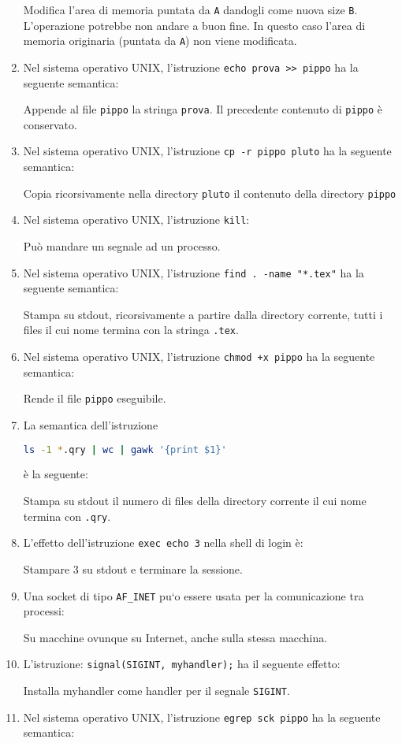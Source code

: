 \documentclass[a4paper,twoside]{article}
\newcommand{\code}[1]{\texttt{#1}}
\begin{document}
\begin{enumerate}
    Modifica l'area di memoria puntata da \code{A} dandogli come nuova size \code{B}. L'operazione potrebbe non andare a buon fine. In questo caso l'area di memoria originaria (puntata da \code{A}) non viene modificata.
    \item Nel sistema operativo UNIX, l'istruzione \code{echo prova >> pippo} ha la seguente semantica: 

    Appende al file \code{pippo} la stringa \code{prova}. Il precedente contenuto di \code{pippo} \`e conservato. 
    \item Nel sistema operativo UNIX, l'istruzione \code{cp -r pippo pluto} ha la seguente semantica: 

    Copia ricorsivamente nella directory \code{pluto} il contenuto della directory \code{pippo} 
    \item Nel sistema operativo UNIX, l'istruzione \code{kill}: 

    Pu\`o mandare un segnale ad un processo.
    \item Nel sistema operativo UNIX, l'istruzione \code{find . -name "*.tex"} ha la seguente semantica:

    Stampa su stdout, ricorsivamente a partire dalla directory corrente, tutti i files il cui nome termina con la stringa \code{.tex}.
    \item Nel sistema operativo UNIX, l'istruzione \code{chmod +x pippo} ha la seguente semantica:

    Rende il file \code{pippo} eseguibile.
    \item La semantica dell'istruzione
    \begin{lstlisting}[language=sh]
    ls -1 *.qry | wc | gawk '{print $1}'
    \end{lstlisting}
    \`e la seguente:

    Stampa su stdout il numero di files della directory corrente il cui nome termina con \code{.qry}.
    \item L'effetto dell'istruzione \code{exec echo 3} nella shell di login \`e:

    Stampare 3 su stdout e terminare la sessione.
    \item Una socket di tipo \code{AF\_INET} pu`o essere usata per la comunicazione tra processi:

    Su macchine ovunque su Internet, anche sulla stessa macchina.
    \item L'istruzione: \code{signal(SIGINT, myhandler);} ha il seguente effetto:

    Installa myhandler come handler per il segnale \code{SIGINT}.
    \item Nel sistema operativo UNIX, l'istruzione \code{egrep sck pippo} ha la seguente semantica:


\end{enumerate}
\end{document}
